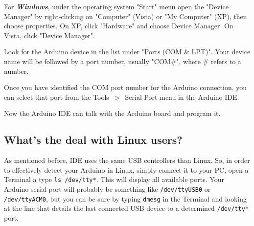 For \emph{\bf{Windows}}, under the operating system "Start" menu open the "Device Manager" by right-clicking on "Computer" (Vista) or "My Computer" (XP), then choose properties. On XP, click "Hardware" and choose Device Manager. On Vista, click "Device Manager".

Look for the Arduino device in the list under "Ports (COM \& LPT)". Your device name will be followed by a port number, usually "COM\#", where \# refers to a number.

Once you have identified the COM port number for the Arduino connection, you can select that port from the Tools~$>$~Serial Port menu in the Arduino IDE.

Now the Arduino IDE can talk with the Arduino board and program it.

\subsection{What's the deal with Linux users?}
As mentioned before, IDE uses the same USB controllers than Linux. So, in order to effectively detect your Arduino in Linux, simply connect it to your PC, open a Terminal a type \texttt{ls /dev/tty*}. This will display all available ports. Your Arduino serial port will probably be something like \texttt{/dev/ttyUSB0} or \texttt{/dev/ttyACM0}, but you can be sure by typing \texttt{dmesg} in the Terminal and looking at the line that details the last connected USB device to a determined \texttt{/dev/tty*} port.